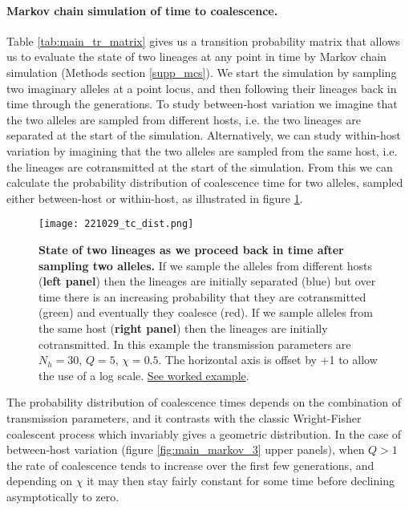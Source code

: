 \documentclass[_main.tex]{subfiles}
\begin{document}
\paragraph{Markov chain simulation of time to coalescence.}  \label{main_mcs}

Table \ref{tab:main_tr_matrix} gives us a transition probability matrix that allows us to evaluate the state of two lineages at any point in time by Markov chain simulation (Methods section \ref{supp_mcs}).  We start the simulation by sampling two imaginary alleles at a point locus, and then following their lineages back in time through the generations.  To study between-host variation we imagine that the two alleles are sampled from different hosts, i.e. the two lineages are separated at the start of the simulation. Alternatively, we can study within-host variation by imagining that the two alleles are sampled from the same host, i.e. the lineages are cotransmitted at the start of the simulation.  From this we can calculate the probability distribution of coalescence time for two alleles, sampled either between-host or within-host, as illustrated in figure \ref{fig:main_markov_4}.   

\begin{figure}[htb]
\centering
\texttt{[image: 221029\_tc\_dist.png]}
\caption{\textbf{State of two lineages as we proceed back in time after sampling two alleles.}  If we sample the alleles from different hosts (\textbf{left panel}) then the lineages are initially separated (blue) but over time there is an increasing probability that they are cotransmitted (green) and eventually they coalesce (red).  If we sample alleles from the same host (\textbf{right panel}) then the lineages are initially cotransmitted. In this example the transmission parameters are $N_h=30$, $Q=5$, $\chi=0.5$.  The horizontal axis is offset by +1 to allow the use of a log scale. \href{https://d-kwiat.github.io/gtg/coalescence-time-basic.html}{See worked example}.
}
\label{fig:main_markov_4}
\end{figure}

The probability distribution of coalescence times depends on the combination of transmission parameters, and it contrasts with the classic Wright-Fisher coalescent process which invariably gives a geometric distribution.  In the case of between-host variation (figure \ref{fig:main_markov_3} upper panels), when $Q>1$ the rate of coalescence tends to increase over the first few generations, and depending on $\chi$ it may then stay fairly constant for some time before declining asymptotically to zero.
\end{document}
